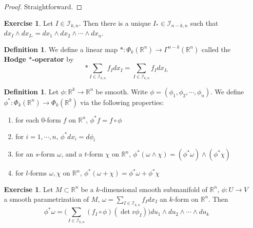 \documentclass[12pt]{amsart}
\theoremstyle{definition}
\newtheorem{defn}[definition]{Definition}
\theoremstyle{definition}
\newtheorem{ex}[definition]{Exercise}
\newcommand{\om}{\omega}
\newcommand{\R}{\mathbb{R}}
\newcommand{\MI}{\mathcal{I}}
\begin{document}
	\begin{proof}
		Straightforward.
	\end{proof}

	\begin{ex}
		Let $I \in \MI_{k, n}$. Then there is a unique $I_* \in \MI_{n-k, n}$ such that $dx_I \wedge dx_{I_*} = dx_1 \wedge dx_2 \wedge \cdots \wedge dx_n$.
	\end{ex}
	
	\begin{defn}
		We define a linear map $*:\Phi_k(\R^n) \rightarrow \Gamma^{n-k}(\R^n)$ called the \textbf{Hodge $*$-operator} by $$* \sum\limits_{I \in \MI_{k,n}} f_I dx_I = \sum\limits_{I \in \MI_{k,n}} f_Idx_{I_*}$$
	\end{defn}

	\begin{defn}
		Let $\phi: \R^k \rightarrow \R^n$ be smooth. Write $\phi = (\phi_1, \phi_2, \cdots, \phi_n)$. We define $\phi^*:\Phi_k(\R^n) \rightarrow \Phi_k(\R^k)$ via the following properties: 
		\begin{enumerate}
			\item for each $0$-form $f$ on $\R^n$, $\phi^*f = f \circ \phi$
			\item  for $i = 1, \cdots , n$, $\phi^* dx_i = d\phi_i$ 
			\item for an $s$-form $\om$, and a $t$-form $\chi$ on $\R^n$,  $\phi^* (\om \wedge \chi) = (\phi^*\om) \wedge (\phi^*\chi)$
			\item for $l$-forms $\om, \chi$ on $\R^n$, $\phi^*(\om + \chi) = \phi^*\om + \phi^*\chi$ 
		\end{enumerate}
	\end{defn}

	\begin{ex}
			Let $M \subset \R^n$ be a $k$-dimensional smooth submanifold of $\R^n$, $\phi: U \rightarrow V$ a smooth parametrization of $M$, $\om = \sum_{I \in \MI_{k,n}} f_Idx_I$  an $k$-form on $\R^n$. Then $$\phi^* \om = \bigg( \sum_{I \in \MI_{k, n}} (f_I \circ \phi) (\det v\phi_I)\bigg)du_1 \wedge du_2 \wedge \cdots \wedge du_k$$ 
	\end{ex}
\end{document}
